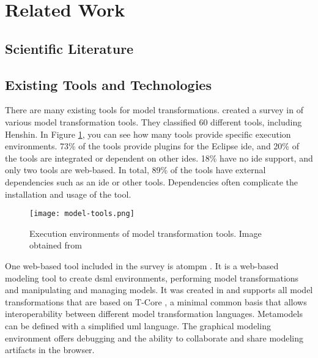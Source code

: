   \section{Related Work}
  \label{sec:related-work}

  \subsection{Scientific Literature}
  \label{subsec:related-scientific-literature}

  \subsection{Existing Tools and Technologies}
  \label{subsec:related-tools}

    There are many existing tools for model transformations. \citeauthor{kahani2019survey} created a survey in \citeyear{kahani2019survey} of various model transformation tools. They classified 60 different tools, including Henshin. In Figure \ref{fig:tools-environments}, you can see how many tools provide specific execution environments. 73\% of the tools provide plugins for the Eclipse \acs{ide}, and 20\% of the tools are integrated or dependent on other \acsp{ide}. 18\% have no \acs{ide} support, and only two tools are web-based. In total, 89\% of the tools have external dependencies such as an \acs{ide} or other tools. Dependencies often complicate the installation and usage of the tool. \cite{kahani2019survey}

  \begin{figure}[h]
    \centering
    \texttt{[image: model-tools.png]}
    \caption{Execution environments of model transformation tools. Image obtained from \cite{kahani2019survey}}
    \label{fig:tools-environments}
  \end{figure}

  One web-based tool included in the survey is \ac{atompm} \cite{atompm}. It is a web-based modeling tool to create \ac{dsml} environments, performing model transformations and manipulating and managing models. \cite{atompm} It was created in \citeyear{atompm} and supports all model transformations that are based on T-Core \cite{tcore}, a minimal common basis that allows interoperability between different model transformation languages. \cite{tcore} Metamodels can be defined with a simplified \acs{uml} language. The graphical modeling environment offers debugging and the ability to collaborate and share modeling artifacts in the browser. \cite{atompm}


